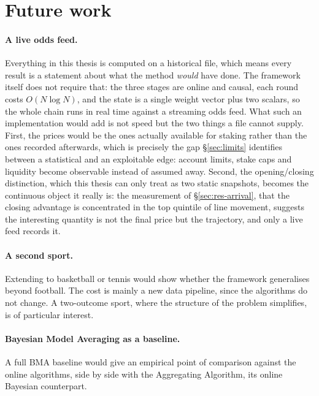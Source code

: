 \documentclass[12pt,a4paper,oneside]{report}
\renewcommand{\_}{\oldunderscore\allowbreak}
\theoremstyle{definition}
\theoremstyle{plain}
\theoremstyle{definition}   %
\begin{document}
\section{Future work}

\paragraph{A live odds feed.} Everything in this thesis is computed on a historical file, which
means every result is a statement about what the method \emph{would} have done. The framework
itself does not require that: the three stages are online and causal, each round costs
$O(N\log N)$, and the state is a single weight vector plus two scalars, so the whole chain runs in
real time against a streaming odds feed. What such an implementation would add is not speed but the
two things a file cannot supply. First, the prices would be the ones actually available for
staking rather than the ones recorded afterwards, which is precisely the gap
\S\ref{sec:limits} identifies between a statistical and an exploitable edge: account limits,
stake caps and liquidity become observable instead of assumed away. Second, the opening/closing
distinction, which this thesis can only treat as two static snapshots, becomes the continuous
object it really is: the measurement of \S\ref{sec:res-arrival}, that the closing advantage is
concentrated in the top quintile of line movement, suggests the interesting quantity is not the
final price but the trajectory, and only a live feed records it.

\paragraph{A second sport.} Extending to basketball or tennis would show whether the framework
generalises beyond football. The cost is mainly a new data pipeline, since the algorithms do not
change. A two-outcome sport, where the structure of the problem simplifies, is of particular
interest.

\paragraph{Bayesian Model Averaging as a baseline.} A full BMA baseline would give an empirical
point of comparison against the online algorithms, side by side with the Aggregating Algorithm,
its online Bayesian counterpart.

\appendix

\end{document}
